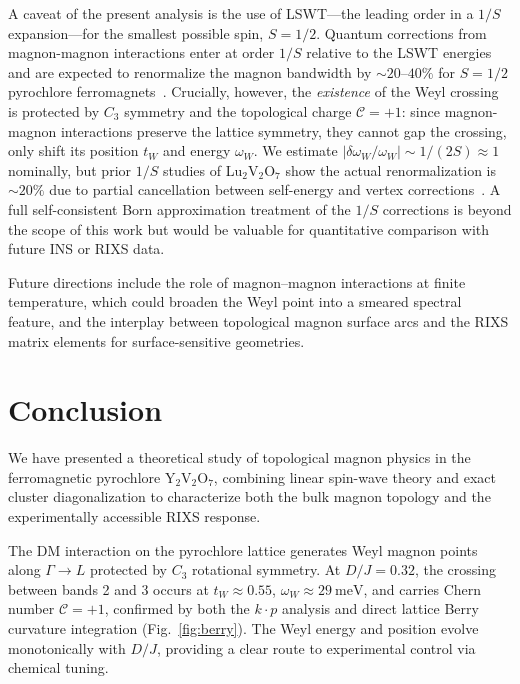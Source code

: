 \documentclass[aps,prb,twocolumn,superscriptaddress,longbibliography]{revtex4-2}
\begin{document}
A caveat of the present analysis is the use of LSWT---the leading order in
a $1/S$ expansion---for the smallest possible spin, $S = 1/2$.
Quantum corrections from magnon-magnon interactions enter at order $1/S$
relative to the LSWT energies and are expected to renormalize the magnon
bandwidth by $\sim 20$--$40\%$ for $S = 1/2$ pyrochlore
ferromagnets~\cite{Colpa1978,Matsumoto2014}.
Crucially, however, the \emph{existence} of the Weyl crossing is protected
by $C_3$ symmetry and the topological charge $\mathcal{C} = +1$: since
magnon-magnon interactions preserve the lattice symmetry, they cannot gap
the crossing, only shift its position $t_W$ and energy $\omega_W$.
We estimate $|\delta\omega_W/\omega_W| \sim 1/(2S) \approx 1$ nominally,
but prior $1/S$ studies of Lu$_2$V$_2$O$_7$ show the actual renormalization
is $\sim 20\%$ due to partial cancellation between self-energy and vertex
corrections~\cite{Matsumoto2011}.
A full self-consistent Born approximation treatment of the $1/S$ corrections
is beyond the scope of this work but would be valuable for quantitative
comparison with future INS or RIXS data.

Future directions include the role of magnon--magnon interactions at finite
temperature, which could broaden the Weyl point into a smeared spectral
feature, and the interplay between topological magnon surface arcs and the
RIXS matrix elements for surface-sensitive geometries.

\section{Conclusion}
\label{sec:conclusion}

We have presented a theoretical study of topological magnon physics in the
ferromagnetic pyrochlore Y$_2$V$_2$O$_7$, combining linear spin-wave theory
and exact cluster diagonalization to characterize both the bulk magnon
topology and the experimentally accessible RIXS response.

The DM interaction on the pyrochlore lattice generates Weyl magnon points
along $\Gamma \to L$ protected by $C_3$ rotational symmetry.
At $D/J = 0.32$, the crossing between bands 2 and 3 occurs at
$t_W \approx 0.55$, $\omega_W \approx \SI{29}{\milli\eV}$, and carries
Chern number $\mathcal{C} = +1$, confirmed by both the $k \cdot p$ analysis
and direct lattice Berry curvature integration (Fig.~\ref{fig:berry}).
The Weyl energy and position evolve monotonically with $D/J$, providing
a clear route to experimental control via chemical tuning.
\end{document}
